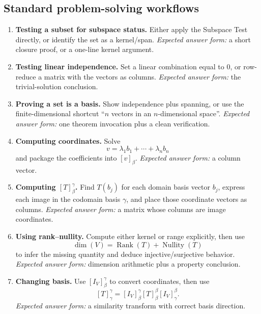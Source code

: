 \subsection{Standard problem-solving workflows}

\begin{examtip}[title={Exam Focus: high-frequency workflows and what each answer should look like}]
\begin{enumerate}[label=\textbf{Workflow \arabic*:}, leftmargin=*]

\item \textbf{Testing a subset for subspace status.}  
Either apply the Subspace Test directly, or identify the set as a kernel/span.  
\emph{Expected answer form:} a short closure proof, or a one-line kernel argument.

\item \textbf{Testing linear independence.}  
Set a linear combination equal to \(0\), or row-reduce a matrix with the vectors as columns.  
\emph{Expected answer form:} the trivial-solution conclusion.

\item \textbf{Proving a set is a basis.}  
Show independence plus spanning, or use the finite-dimensional shortcut ``\(n\) vectors in an \(n\)-dimensional space''.  
\emph{Expected answer form:} one theorem invocation plus a clean verification.

\item \textbf{Computing coordinates.}  
Solve
\[
v=\lambda_1b_1+\cdots+\lambda_n b_n
\]
and package the coefficients into \([v]_\beta\).  
\emph{Expected answer form:} a column vector.

\item \textbf{Computing \([T]^\gamma_\beta\).}  
Find \(T(b_j)\) for each domain basis vector \(b_j\), express each image in the codomain basis \(\gamma\), and place those coordinate vectors as columns.  
\emph{Expected answer form:} a matrix whose columns are image coordinates.

\item \textbf{Using rank--nullity.}  
Compute either kernel or range explicitly, then use
\[
\dim(V)=\operatorname{Rank}(T)+\operatorname{Nullity}(T)
\]
to infer the missing quantity and deduce injective/surjective behavior.  
\emph{Expected answer form:} dimension arithmetic plus a property conclusion.

\item \textbf{Changing basis.}  
Use \([I_V]^\gamma_\beta\) to convert coordinates, then use
\[
[T]^\gamma_\gamma=[I_V]^\gamma_\beta [T]^\beta_\beta [I_V]^\beta_\gamma.
\]
\emph{Expected answer form:} a similarity transform with correct basis direction.


\end{enumerate}
\end{examtip}
